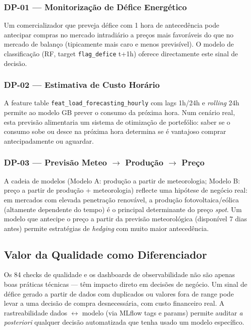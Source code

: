 \documentclass[11pt,a4paper]{article}
\begin{document}
\subsubsection{DP-01 — Monitorização de Défice Energético}

Um comercializador que preveja défice com 1 hora de antecedência pode antecipar compras no mercado intradiário a preços mais favoráveis do que no mercado de balanço (tipicamente mais caro e menos previsível). O modelo de classificação (RF, target \texttt{flag\_defice} t+1h) oferece directamente este sinal de decisão.

\subsubsection{DP-02 — Estimativa de Custo Horário}

A feature table \texttt{feat\_load\_forecasting\_hourly} com lags 1h/24h e \textit{rolling} 24h permite ao modelo GB prever o consumo da próxima hora. Num cenário real, esta previsão alimentaria um sistema de otimização de portefólio: saber se o consumo sobe ou desce na próxima hora determina se é vantajoso comprar antecipadamente ou aguardar.

\subsubsection{DP-03 — Previsão Meteo $\rightarrow$ Produção $\rightarrow$ Preço}

A cadeia de modelos (Modelo A: produção a partir de meteorologia; Modelo B: preço a partir de produção + meteorologia) reflecte uma hipótese de negócio real: em mercados com elevada penetração renovável, a produção fotovoltaica/eólica (altamente dependente do tempo) é o principal determinante do preço \textit{spot}. Um modelo que antecipe o preço a partir da previsão meteorológica (disponível 7 dias antes) permite estratégias de \textit{hedging} com muito maior antecedência.

\subsection{Valor da Qualidade como Diferenciador}

Os 84 checks de qualidade e os dashboards de observabilidade não são apenas boas práticas técnicas --- têm impacto direto em decisões de negócio. Um sinal de défice gerado a partir de dados com duplicados ou valores fora de range pode levar a uma decisão de compra desnecessária, com custo financeiro real. A rastreabilidade dados $\leftrightarrow$ modelo (via MLflow tags e params) permite auditar \textit{a posteriori} qualquer decisão automatizada que tenha usado um modelo específico.
\end{document}
